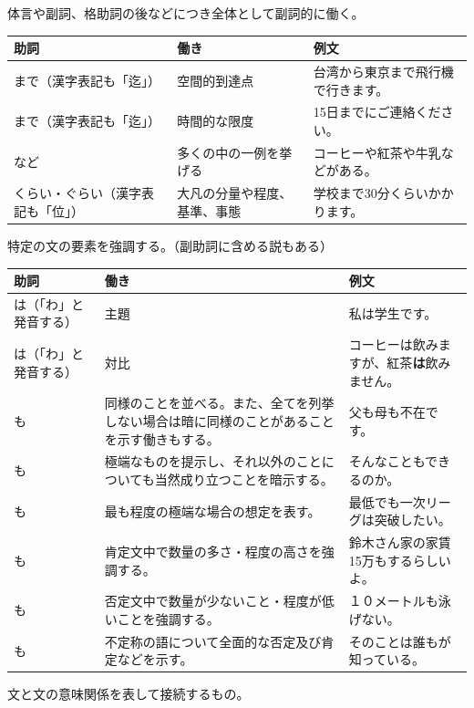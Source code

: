 \documentclass[a4paper,12pt]{article}
\begin{document}
体言や副詞、格助詞の後などにつき全体として副詞的に働く。
\begin{longtable}[c]{|C{0.1\textwidth}|C{0.2\textwidth}|C{0.5\textwidth}|}
\hline
助詞 & 働き & 例文 \\\hline\endhead
まで（漢字表記も「迄」） & 空間的到達点 & 台湾から東京まで飛行機で行きます。 \\\hline
まで（漢字表記も「迄」） & 時間的な限度 & 15日までにご連絡ください。 \\\hline
など & 多くの中の一例を挙げる & コーヒーや紅茶や牛乳などがある。 \\\hline
くらい・ぐらい（漢字表記も「位」） & 大凡の分量や程度、基準、事態 & 学校まで30分くらいかかります。 \\\hline
\end{longtable}
特定の文の要素を強調する。（副助詞に含める説もある）
\begin{longtable}[c]{|C{0.15\textwidth}|C{0.35\textwidth}|C{0.35\textwidth}|}
\hline
助詞 & 働き & 例文 \\\hline\endhead
は（「わ」と発音する） & 主題 & 私は学生です。 \\\hline
は（「わ」と発音する） & 対比 & コーヒーは飲みますが、紅茶\textbf{は}飲みません。 \\\hline
も & 同様のことを並べる。また、全てを列挙しない場合は暗に同様のことがあることを示す働きもする。 & 父も母も不在です。 \\\hline
も & 極端なものを提示し、それ以外のことについても当然成り立つことを暗示する。 & そんなこともできるのか。 \\\hline
も & 最も程度の極端な場合の想定を表す。 & 最低でも一次リーグは突破したい。 \\\hline
も & 肯定文中で数量の多さ・程度の高さを強調する。 & 鈴木さん家の家賃15万もするらしいよ。 \\\hline
も & 否定文中で数量が少ないこと・程度が低いことを強調する。 & １０メートルも泳げない。 \\\hline
も & 不定称の語について全面的な否定及び肯定などを示す。 & そのことは誰もが知っている。 \\\hline
\end{longtable}
文と文の意味関係を表して接続するもの。
\end{document}
